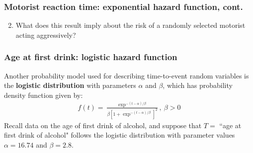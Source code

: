\begin{frame}
\frametitle{Motorist reaction time: exponential hazard function, cont.}
\begin{enumerate}
\setcounter{enumi}{1}
\item What does this result imply about the risk of a randomly selected motorist acting aggressively?
\end{enumerate}
\vskip150pt
\end{frame}

\begin{frame}
\frametitle{Age at first drink: logistic hazard function}
Another probability model used for describing time-to-event random variables is the \textbf{logistic distribution} with parameters $\alpha$ and $\beta$, which has probability density function given by:
\vskip3pt
\begin{eqnarray}
f(t) = \frac{\exp^{-(t-\alpha)/\beta}} {\beta \left[1 + \exp^{-(t-\alpha)/\beta} \right]^2} ,~\beta > 0 \nonumber
\end{eqnarray}
\vskip3pt
Recall data on the age of first drink of alcohol, and suppose that $T=$ ``age at first drink of alcohol" follows the {logistic distribution} with parameter values $\alpha=16.74$ and $\beta=2.8$.
\end{frame}

